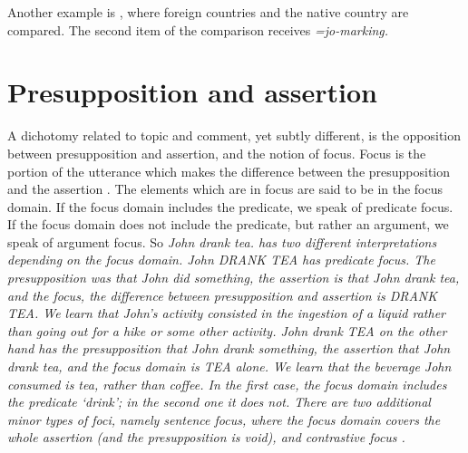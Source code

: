 Another example is , where foreign countries and the native country are compared. The second item of the comparison   receives \em=jo\em-marking.


\section{Presupposition and assertion}\label{sec:disc:Presuppositionandassertion}
A dichotomy related to topic and comment, yet subtly different, is the opposition between presupposition and assertion, and the notion of focus.
Focus is the portion of the utterance which makes the difference between the presupposition and the assertion \citep{Lambrecht1994}. The elements which are in focus are said to be in the focus domain. If the focus domain includes the predicate, we speak of predicate focus. If the focus domain does not include the predicate, but rather an argument, we speak of argument focus. So \em John drank tea. \em has two different interpretations depending on the focus domain. \em John DRANK TEA \em has predicate focus. The presupposition was that John did something, the assertion is that John drank tea, and the focus, the difference between presupposition and assertion is DRANK TEA. We learn that John's activity consisted in the ingestion of a liquid rather than going out for a hike or some other activity.
\em John drank TEA \em on the other hand has the presupposition that John drank something, the assertion that John drank tea, and the focus domain is TEA alone. We learn that the beverage John consumed is tea, rather than coffee. In the first case, the focus domain includes the predicate `drink'; in the second one it does not.
There are two additional minor types of foci, namely sentence focus, where the focus domain covers the whole assertion (and the presupposition is void), and contrastive focus \citep[233,286]{Lambrecht1994}.

